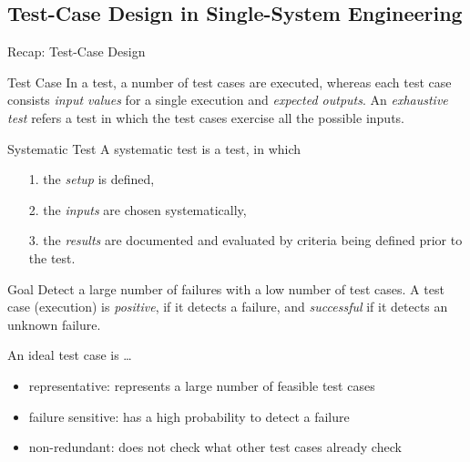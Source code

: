 \subsection{Test-Case Design in Single-System Engineering}
\begin{frame}{Recap: Test-Case Design }
	\begin{mycolumns}
		\begin{definition}{Test Case \mysource{\ludewiglichter}}
			In a test, a number of test cases are executed, whereas each test case consists \emph{input values} for a single execution and \emph{expected outputs}. An \emph{exhaustive test} refers a test in which the test cases exercise all the possible inputs.
		\end{definition}
		\pause
		\begin{definition}{Systematic Test \mysource{\ludewiglichter}}
			A systematic test is a test, in which
			\begin{itemize}
				\setlength\itemsep{.1em}
				\item[1.] the \emph{setup} is defined,
				\item[2.] the \emph{inputs} are chosen systematically,
				\item[3.] the \emph{results} are documented and evaluated by criteria being defined prior to the test. 
			\end{itemize}
		\end{definition}
	\mynextcolumn
		\pause
		\begin{note}{Goal \mysource{\ludewiglichter}}%
			Detect a large number of failures with a low number of test cases. A test case (execution) is \emph{positive}, if it detects a failure, and \emph{successful} if it detects an unknown failure.
		\end{note}
		\pause
		\begin{definition}{An ideal test case is \ldots \mysource{\ludewiglichter}}
			\begin{itemize}
				\setlength\itemsep{.1em}
				\item representative: represents a large number of feasible test cases
				\item failure sensitive: has a high probability to detect a failure
				\item non-redundant: does not check what other test cases already check
			\end{itemize}
		\end{definition}
	\end{mycolumns}
\end{frame}

